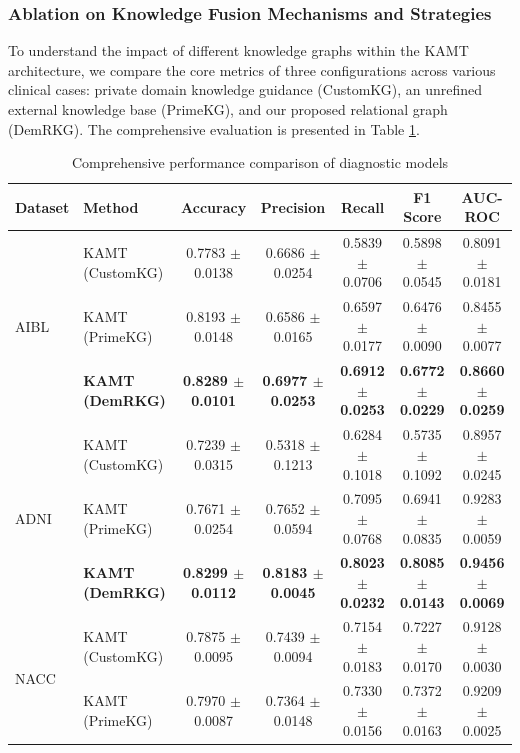 \documentclass[lettersize,journal]{IEEEtran}
\begin{document}
\subsubsection{Ablation on Knowledge Fusion Mechanisms and Strategies}
To understand the impact of different knowledge graphs within the KAMT architecture, we compare the core metrics of three configurations across various clinical cases: private domain knowledge guidance (CustomKG), an unrefined external knowledge base (PrimeKG), and our proposed relational graph (DemRKG). The comprehensive evaluation is presented in Table \ref{tab:comprehensive_performance}.

\begin{table}[htbp]
\centering
\caption{Comprehensive performance comparison of diagnostic models}
\label{tab:comprehensive_performance}
\renewcommand{\arraystretch}{1.3} %
\begin{tabular}{llccccc}
\toprule
\textbf{Dataset} & \textbf{Method} & \textbf{Accuracy} & \textbf{Precision} & \textbf{Recall} & \textbf{F1 Score} & \textbf{AUC-ROC} \\
\midrule
\multirow{3}{*}{AIBL} 
& KAMT (CustomKG)      & 0.7783 $\pm$ 0.0138 & 0.6686 $\pm$ 0.0254 & 0.5839 $\pm$ 0.0706 & 0.5898 $\pm$ 0.0545 & 0.8091 $\pm$ 0.0181 \\
& KAMT (PrimeKG)       & 0.8193 $\pm$ 0.0148 & 0.6586 $\pm$ 0.0165 & 0.6597 $\pm$ 0.0177 & 0.6476 $\pm$ 0.0090 & 0.8455 $\pm$ 0.0077 \\
& \textbf{KAMT (DemRKG)} & \textbf{0.8289 $\pm$ 0.0101} & \textbf{0.6977 $\pm$ 0.0253} & \textbf{0.6912 $\pm$ 0.0253} & \textbf{0.6772 $\pm$ 0.0229} & \textbf{0.8660 $\pm$ 0.0259} \\
\midrule
\multirow{3}{*}{ADNI} 
& KAMT (CustomKG)      & 0.7239 $\pm$ 0.0315 & 0.5318 $\pm$ 0.1213 & 0.6284 $\pm$ 0.1018 & 0.5735 $\pm$ 0.1092 & 0.8957 $\pm$ 0.0245 \\
& KAMT (PrimeKG)       & 0.7671 $\pm$ 0.0254 & 0.7652 $\pm$ 0.0594 & 0.7095 $\pm$ 0.0768 & 0.6941 $\pm$ 0.0835 & 0.9283 $\pm$ 0.0059 \\
& \textbf{KAMT (DemRKG)} & \textbf{0.8299 $\pm$ 0.0112} & \textbf{0.8183 $\pm$ 0.0045} & \textbf{0.8023 $\pm$ 0.0232} & \textbf{0.8085 $\pm$ 0.0143} & \textbf{0.9456 $\pm$ 0.0069} \\
\midrule
\multirow{3}{*}{NACC} 
& KAMT (CustomKG)      & 0.7875 $\pm$ 0.0095 & 0.7439 $\pm$ 0.0094 & 0.7154 $\pm$ 0.0183 & 0.7227 $\pm$ 0.0170 & 0.9128 $\pm$ 0.0030 \\
& KAMT (PrimeKG)       & 0.7970 $\pm$ 0.0087 & 0.7364 $\pm$ 0.0148 & 0.7330 $\pm$ 0.0156 & 0.7372 $\pm$ 0.0163 & 0.9209 $\pm$ 0.0025 \\

\end{tabular}
\end{table}
\end{document}
